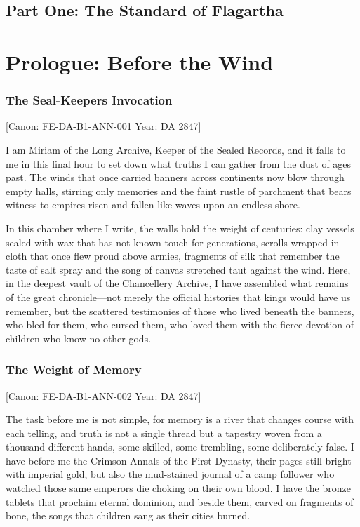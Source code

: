 \section{Part One: The Standard of
Flagartha}\label{part-one-the-standard-of-flagartha}

\chapter{Prologue: Before the Wind}\label{prologue-before-the-wind}

\subsection{The Seal-Keeper\textquotesingle s
Invocation}\label{the-seal-keepers-invocation}

{[}Canon: FE-DA-B1-ANN-001 \textbar{} Year: DA 2847{]}

I am Miriam of the Long Archive, Keeper of the Sealed Records, and it
falls to me in this final hour to set down what truths I can gather from
the dust of ages past. The winds that once carried banners across
continents now blow through empty halls, stirring only memories and the
faint rustle of parchment that bears witness to empires risen and fallen
like waves upon an endless shore.

In this chamber where I write, the walls hold the weight of centuries:
clay vessels sealed with wax that has not known touch for generations,
scrolls wrapped in cloth that once flew proud above armies, fragments of
silk that remember the taste of salt spray and the song of canvas
stretched taut against the wind. Here, in the deepest vault of the
Chancellery Archive, I have assembled what remains of the great
chronicle---not merely the official histories that kings would have us
remember, but the scattered testimonies of those who lived beneath the
banners, who bled for them, who cursed them, who loved them with the
fierce devotion of children who know no other gods.

\subsection{The Weight of Memory}\label{the-weight-of-memory}

{[}Canon: FE-DA-B1-ANN-002 \textbar{} Year: DA 2847{]}

The task before me is not simple, for memory is a river that changes
course with each telling, and truth is not a single thread but a
tapestry woven from a thousand different hands, some skilled, some
trembling, some deliberately false. I have before me the Crimson Annals
of the First Dynasty, their pages still bright with imperial gold, but
also the mud-stained journal of a camp follower who watched those same
emperors die choking on their own blood. I have the bronze tablets that
proclaim eternal dominion, and beside them, carved on fragments of bone,
the songs that children sang as their cities burned.


